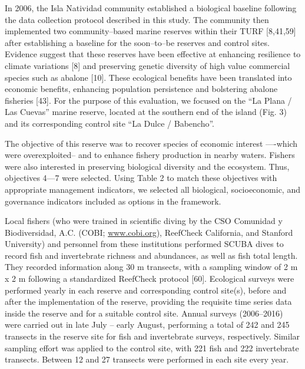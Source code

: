 \documentclass[12pt,]{article}
\begin{document}
In 2006, the Isla Natividad community established a biological baseline
following the data collection protocol described in this study. The
community then implemented two community--based marine reserves within
their TURF {[}8,41,59{]} after establishing a baseline for the
soon--to--be reserves and control sites. Evidence suggest that these
reserves have been effective at enhancing resilience to climate
variations {[}8{]} and preserving genetic diversity of high value
commercial species such as abalone {[}10{]}. These ecological benefits
have been translated into economic benefits, enhancing population
persistence and bolstering abalone fisheries {[}43{]}. For the purpose
of this evaluation, we focused on the ``La Plana / Las Cuevas'' marine
reserve, located at the southern end of the island (Fig. 3) and its
corresponding control site ``La Dulce / Babencho''.

The objective of this reserve was to recover species of economic
interest ----which were overexploited-- and to enhance fishery
production in nearby waters. Fishers were also interested in preserving
biological diversity and the ecosystem. Thus, objectives 4---7 were
selected. Using Table 2 to match these objectives with appropriate
management indicators, we selected all biological, socioeconomic, and
governance indicators included as options in the framework.

Local fishers (who were trained in scientific diving by the CSO
Comunidad y Biodiversidad, A.C. (COBI; \url{www.cobi.org}), ReefCheck
California, and Stanford University) and personnel from these
institutions performed SCUBA dives to record fish and invertebrate
richness and abundances, as well as fish total length. They recorded
information along 30 m transects, with a sampling window of 2 m x 2 m
following a standardized ReefCheck protocol {[}60{]}. Ecological surveys
were performed yearly in each reserve and corresponding control site(s),
before and after the implementation of the reserve, providing the
requisite time series data inside the reserve and for a suitable control
site. Annual surveys (2006--2016) were carried out in late July -- early
August, performing a total of 242 and 245 transects in the reserve site
for fish and invertebrate surveys, respectively. Similar sampling effort
was applied to the control site, with 221 fish and 222 invertebrate
transects. Between 12 and 27 transects were performed in each site every
year.
\end{document}
